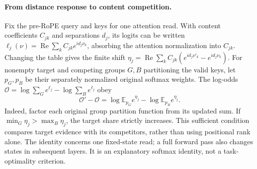 \paragraph{From distance response to content competition.}
\label{sec:content-competition}
Fix the pre-RoPE query and keys for one attention read. With content coefficients
$C_{jk}$ and separations $d_j$, its logits can be written
$\ell_j(\nu)=\operatorname{Re}\sum_k C_{jk}e^{i d_j\nu_k}$, absorbing the
attention normalization into $C_{jk}$. Changing the table gives the finite shift
$\eta_j=\operatorname{Re}\sum_k C_{jk}(e^{i d_j\nu'_k}-e^{i d_j\nu_k})$.
For nonempty target and competing groups $G,B$ partitioning the valid keys,
let $p_G,p_B$ be their separately normalized original softmax weights. The
log-odds $\mathcal O=\log\sum_Ge^{\ell_j}-\log\sum_Be^{\ell_j}$ obey
\begin{equation}
\mathcal O'-\mathcal O
=\log\mathbb E_{p_G}e^{\eta_j}-\log\mathbb E_{p_B}e^{\eta_j}.
\label{eq:content-competition}
\end{equation}
Indeed, factor each original group partition function from its updated sum.
If $\min_G\eta_j>\max_B\eta_j$, the target share strictly increases.
This sufficient condition compares target evidence with its competitors,
rather than using positional rank alone. The identity concerns one fixed-state
read; a full forward pass also changes states in subsequent layers.
It is an explanatory softmax identity, not a task-optimality criterion.
